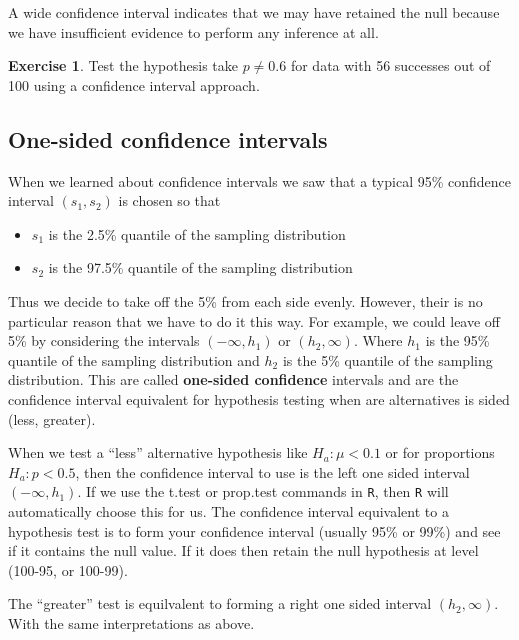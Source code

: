 \documentclass[
]{book}
\theoremstyle{definition}
\theoremstyle{definition}
\theoremstyle{definition}
\newtheorem{exercise}{Exercise}[chapter]
\theoremstyle{definition}
\theoremstyle{remark}
\begin{document}
A wide confidence interval indicates that we may have retained the null because we have insufficient evidence to perform any inference at all.

\begin{exercise}
\protect\hypertarget{exr:unnamed-chunk-578}{}\label{exr:unnamed-chunk-578}Test the hypothesis take \(p\neq0.6\) for data with 56 successes out of 100 using a confidence interval approach.
\end{exercise}

\hypertarget{one-sided-confidence-intervals}{%
\subsection{One-sided confidence intervals}\label{one-sided-confidence-intervals}}

When we learned about confidence intervals we saw that a typical 95\% confidence interval \((s_1, s_2)\) is chosen so that

\begin{itemize}
\item
  \(s_1\) is the 2.5\% quantile of the sampling distribution
\item
  \(s_2\) is the 97.5\% quantile of the sampling distribution
\end{itemize}

Thus we decide to take off the 5\% from each side evenly. However, their is no particular reason that we have to do it this way. For example, we could leave off 5\% by considering the intervals \((-\infty, h_1)\) or \((h_2, \infty)\). Where \(h_1\) is the 95\% quantile of the sampling distribution and \(h_2\) is the 5\% quantile of the sampling distribution. This are called \textbf{one-sided confidence} intervals and are the confidence interval equivalent for hypothesis testing when are alternatives is sided (less, greater).

When we test a ``less'' alternative hypothesis like \(H_a: \mu < 0.1\) or for proportions \(H_a: p < 0.5\), then the confidence interval to use is the left one sided interval \((-\infty, h_1)\). If we use the t.test or prop.test commands in \texttt{R}, then \texttt{R} will automatically choose this for us. The confidence interval equivalent to a hypothesis test is to form your confidence interval (usually 95\% or 99\%) and see if it contains the null value. If it does then retain the null hypothesis at level (100-95, or 100-99).

The ``greater'' test is equilvalent to forming a right one sided interval \((h_2, \infty)\). With the same interpretations as above.
\end{document}
